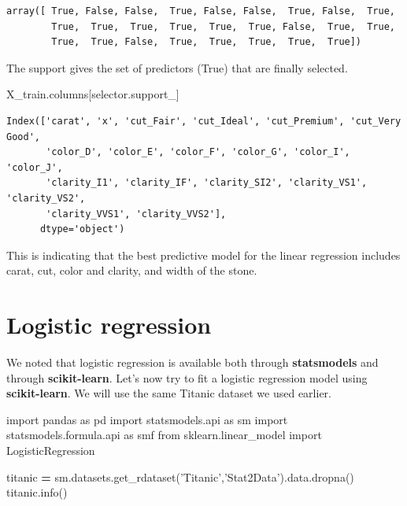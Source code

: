\documentclass[
  letterpaper,
]{scrbook}
\newenvironment{Shaded}{\begin{snugshade}}{\end{snugshade}}
\newcommand{\ImportTok}[1]{#1}
\newcommand{\NormalTok}[1]{#1}
\newcommand{\OperatorTok}[1]{\textcolor[rgb]{0.81,0.36,0.00}{\textbf{#1}}}
\newcommand{\StringTok}[1]{\textcolor[rgb]{0.31,0.60,0.02}{#1}}
\begin{document}
\begin{verbatim}
array([ True, False, False,  True, False, False,  True, False,  True,
        True,  True,  True,  True,  True,  True, False,  True,  True,
        True,  True, False,  True,  True,  True,  True,  True])
\end{verbatim}

The support gives the set of predictors (True) that are finally selected.

\begin{Shaded}
\begin{Highlighting}[]
\NormalTok{X_train.columns[selector.support_]}
\end{Highlighting}
\end{Shaded}

\begin{verbatim}
Index(['carat', 'x', 'cut_Fair', 'cut_Ideal', 'cut_Premium', 'cut_Very Good',
       'color_D', 'color_E', 'color_F', 'color_G', 'color_I', 'color_J',
       'clarity_I1', 'clarity_IF', 'clarity_SI2', 'clarity_VS1', 'clarity_VS2',
       'clarity_VVS1', 'clarity_VVS2'],
      dtype='object')
\end{verbatim}

This is indicating that the best predictive model for the linear regression includes carat, cut, color and clarity, and width of the stone.

\hypertarget{logistic-regression-1}{%
\section{Logistic regression}\label{logistic-regression-1}}

We noted that logistic regression is available both through \textbf{statsmodels} and through \textbf{scikit-learn}. Let's now try to fit a
logistic regression model using \textbf{scikit-learn}. We will use the same
Titanic dataset we used earlier.

\begin{Shaded}
\begin{Highlighting}[]
\ImportTok{import}\NormalTok{ pandas }\ImportTok{as}\NormalTok{ pd}
\ImportTok{import}\NormalTok{ statsmodels.api }\ImportTok{as}\NormalTok{ sm}
\ImportTok{import}\NormalTok{ statsmodels.formula.api }\ImportTok{as}\NormalTok{ smf}
\ImportTok{from}\NormalTok{ sklearn.linear_model }\ImportTok{import}\NormalTok{ LogisticRegression}

\NormalTok{titanic }\OperatorTok{=}\NormalTok{ sm.datasets.get_rdataset(}\StringTok{'Titanic'}\NormalTok{,}\StringTok{'Stat2Data'}\NormalTok{).data.dropna()}
\NormalTok{titanic.info()}
\end{Highlighting}
\end{Shaded}
\end{document}
